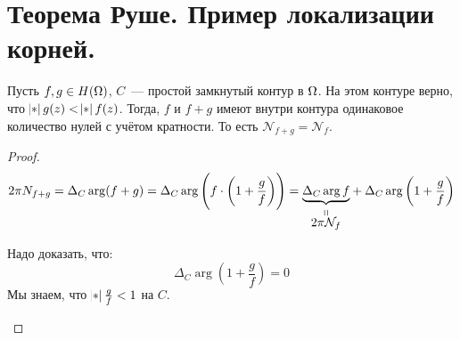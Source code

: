\section{Теорема Руше. Пример локализации корней.}

\begin{theorem}[Руше]

    Пусть $f, g \in H(\Om)$,
    $C$~--- простой замкнутый контур в $\Om$.
    На этом контуре верно, что $\abs{g(z)} < \abs{f(z)}$.
    Тогда, $f$ и $f+g$ имеют внутри контура одинаковое количество
    нулей с учётом кратности. То есть $\mathcal{N}_{f+g} = \mathcal{N}_f$. 
\end{theorem}

\begin{proof}

    \[
        2\pi N_{f+g} = \Delta_C \arg(f+g)
        = \Delta_C \arg\left(f \cdot \left(1 + \frac{g}{f}\right)\right)
        = \stackbelow{\underbrace{\Delta_C \arg f}}{2\pi \mathcal{N}_f} + \Delta_C \arg \left(1 + \frac{g}{f}\right)
    \]

    Надо доказать, что:
    $$\Delta_C \arg \left(1 + \frac gf\right) = 0$$
    Мы знаем, что $\abs{\frac gf} < 1$ на $C$.
    \begin{center}

        \begin{tikzpicture}[x=0.75pt,y=0.75pt,yscale=-1,xscale=1]


\end{tikzpicture}
\end{center}
\end{proof}
